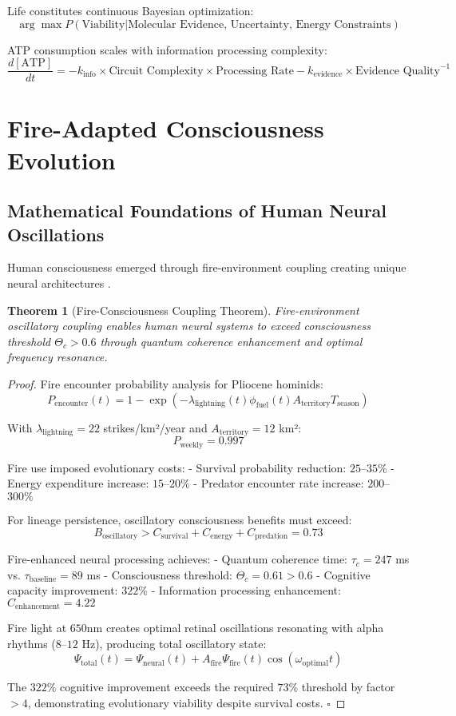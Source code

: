 \documentclass[12pt,a4paper]{article}
\newtheorem{theorem}{Theorem}[section]
\begin{document}
Life constitutes continuous Bayesian optimization:
$$\arg\max P(\text{Viability} | \text{Molecular Evidence, Uncertainty, Energy Constraints})$$

ATP consumption scales with information processing complexity:
$$\frac{d[\text{ATP}]}{dt} = -k_{\text{info}} \times \text{Circuit Complexity} \times \text{Processing Rate} - k_{\text{evidence}} \times \text{Evidence Quality}^{-1}$$

\section{Fire-Adapted Consciousness Evolution}

\subsection{Mathematical Foundations of Human Neural Oscillations}

Human consciousness emerged through fire-environment coupling creating unique neural architectures \citep{wrangham2009catching}.

\begin{theorem}[Fire-Consciousness Coupling Theorem]
Fire-environment oscillatory coupling enables human neural systems to exceed consciousness threshold $\Theta_c > 0.6$ through quantum coherence enhancement and optimal frequency resonance.
\end{theorem}

\begin{proof}
Fire encounter probability analysis for Pliocene hominids:
$$P_{\text{encounter}}(t) = 1 - \exp(-\lambda_{\text{lightning}}(t) \phi_{\text{fuel}}(t) A_{\text{territory}} T_{\text{season}})$$

With $\lambda_{\text{lightning}} = 22$ strikes/km²/year and $A_{\text{territory}} = 12$ km²:
$$P_{\text{weekly}} = 0.997$$

Fire use imposed evolutionary costs:
- Survival probability reduction: $25$--$35\%$
- Energy expenditure increase: $15$--$20\%$
- Predator encounter rate increase: $200$--$300\%$

For lineage persistence, oscillatory consciousness benefits must exceed:
$$B_{\text{oscillatory}} > C_{\text{survival}} + C_{\text{energy}} + C_{\text{predation}} = 0.73$$

Fire-enhanced neural processing achieves:
- Quantum coherence time: $\tau_c = 247$ ms vs. $\tau_{\text{baseline}} = 89$ ms
- Consciousness threshold: $\Theta_c = 0.61 > 0.6$
- Cognitive capacity improvement: $322\%$
- Information processing enhancement: $C_{\text{enhancement}} = 4.22$

Fire light at $650$nm creates optimal retinal oscillations resonating with alpha rhythms ($8$--$12$ Hz), producing total oscillatory state:
$$\Psi_{\text{total}}(t) = \Psi_{\text{neural}}(t) + A_{\text{fire}} \Psi_{\text{fire}}(t)\cos(\omega_{\text{optimal}} t)$$

The $322\%$ cognitive improvement exceeds the required $73\%$ threshold by factor $>4$, demonstrating evolutionary viability despite survival costs. $\square$
\end{proof}
\end{document}
